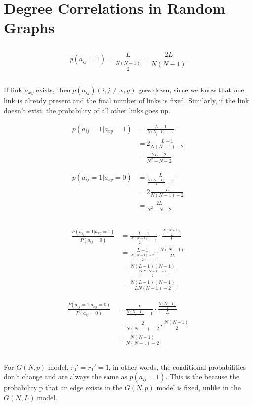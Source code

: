 \section{Degree Correlations in Random Graphs}
\subsection{}
$$ p(a_{ij} = 1) = \frac{ L }{ \frac{ N(N-1) }{ 2 } } = \frac{ 2L }{ N(N-1) } $$

\subsection{}
If link $ a_{xy} $ exists, then $ p(a_{ij}) (i,j \neq x,y) $ goes down, since we know that one link is already present and the final number of links is fixed. Similarly, if the link doesn't exist, the probability of all other links goes up.

\begin{align*}	
	p(a_{ij} = 1 | a_{xy} = 1) &= \frac{ L-1 }{ \frac{ N(N-1) }{ 2 } - 1 } \\
	&= 2 \frac{ L-1 }{ N(N-1) - 2 } \\
	&= \frac{ 2L-2 }{ N^2-N-2 }
\end{align*}

\begin{align*}	
	p(a_{ij} = 1 | a_{xy} = 0) &= \frac{ L }{ \frac{ N(N-1) }{ 2 } - 1 } \\
	&= 2 \frac{ L }{ N(N-1) - 2 } \\
	&= \frac{ 2L }{ N^2-N-2 }
\end{align*}

\subsection{}
\begin{align*}
	\frac{P \left( a_{ij} = 1 | a_{xy} = 1 \right)}{P \left( a_{ij}=0 \right)} &=\frac{L-1}{\frac{N(N-1)}{2}-1} \cdot \frac{\frac{N(N-1)}{2}}{L}\\
	&=\frac{L-1}{\frac{N(N-1)-2}{2}} \cdot \frac{N(N-1)}{2L}\\
	&= \frac{N(L-1)(N-1)}{\frac{2LN(N-1)-2}{2}}\\
	&= \frac{N(L-1)(N-1)}{LN(N-1)-2}
\end{align*}

\begin{align*}
	\frac{P \left( a_{ij} = 1 | a_{xy} = 0 \right)}{P \left( a_{ij}=0 \right)} &=\frac{L}{\frac{N(N-1)}{2}-1} \cdot \frac{\frac{N(N-1)}{2}}{L}\\
	&= \frac{2}{N(N-1)-2} \cdot \frac{N(N-1)}{2}\\
	&= \frac{N(N-1)}{N(N-1)-2}
\end{align*}

\subsection{}
For $G(N,p)$ model, $r_0' = r_1' = 1$, in other words, the conditional probabilities don't change and are always the same as $p(a_{ij} = 1)$. This is the because the probability p that an edge exists in the $G(N,p)$ model is fixed, unlike in the $G(N,L)$ model.

\subsection{}